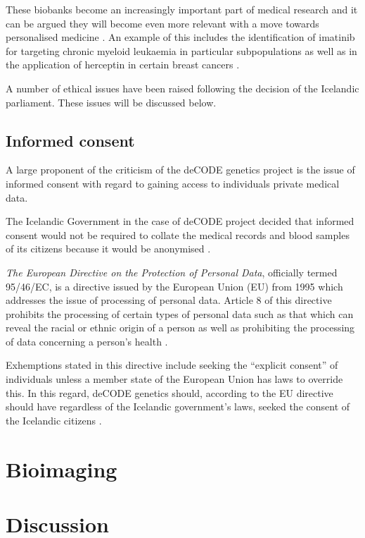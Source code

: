 \documentclass[british,a4paper, 12pt]{article}
\begin{document}
These biobanks become an increasingly important part of medical research and 
it can be argued they will become even more relevant with a move towards 
personalised medicine \parencite{watson2010integrating}. An example of this
includes the identification of imatinib for targeting chronic myeloid leukaemia 
in particular subpopulations \parencite{cohen2002approval} as well as in the
application of herceptin in certain breast cancers \parencite{lemieux2009role}.

A number of ethical issues have been raised 
following the decision of the Icelandic parliament. These issues will be 
discussed below.

\subsection{Informed consent}
A large proponent of the criticism of the deCODE genetics project is the issue
of informed consent with regard to gaining access to individuals private
medical data.

The Icelandic Government in the case of deCODE project decided that informed 
consent would not be required to collate the medical records and blood samples 
of its citizens because it would be anonymised \parencite{chadwick1999icelandic}.

\emph{The European Directive on the Protection of Personal Data}, officially 
termed 95/46/EC, is a directive issued by the European Union (EU) from 1995 which 
addresses the issue of processing of personal data. Article 8 of this directive 
prohibits the processing of certain types of personal data such as that which 
can reveal the racial or ethnic origin of a person as well as prohibiting the 
processing of data concerning a person's health \parencite{directive199595}.

Exhemptions stated in this directive include seeking the ``explicit consent'' 
of individuals unless a member state of the European Union has laws to override 
this. In this regard, deCODE genetics should, according to the EU directive 
should have regardless of the Icelandic government's laws, seeked the consent of 
the Icelandic citizens \parencite{carey2009data}.

\section{Bioimaging}

\section{Discussion}

\printbibliography
\end{document}
